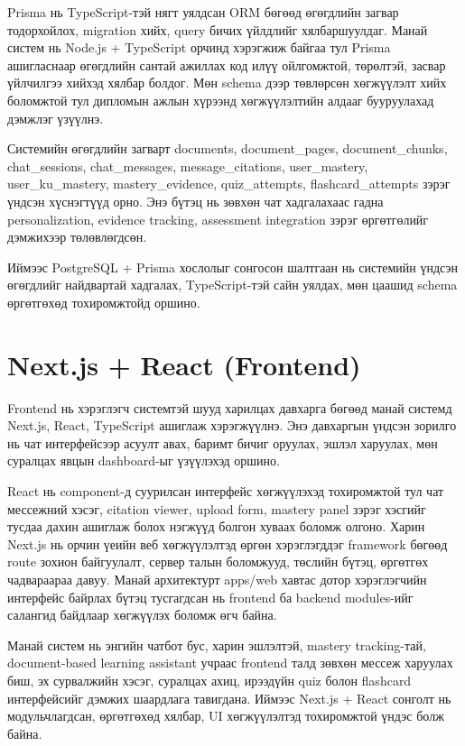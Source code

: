 \documentclass[12pt,A4]{report}
\newcommand{\eng}[1]{#1}
\begin{document}
\eng{Prisma} нь \eng{TypeScript}-тэй нягт уялдсан \eng{ORM} бөгөөд өгөгдлийн загвар тодорхойлох, migration хийх, query бичих үйлдлийг хялбаршуулдаг. Манай систем нь \eng{Node.js + TypeScript} орчинд хэрэгжиж байгаа тул \eng{Prisma} ашигласнаар өгөгдлийн сантай ажиллах код илүү ойлгомжтой, төрөлтэй, засвар үйлчилгээ хийхэд хялбар болдог. Мөн schema дээр төвлөрсөн хөгжүүлэлт хийх боломжтой тул дипломын ажлын хүрээнд хөгжүүлэлтийн алдааг бууруулахад дэмжлэг үзүүлнэ.

Системийн өгөгдлийн загварт \eng{documents}, \eng{document\_pages}, \eng{document\_chunks}, \eng{chat\_sessions}, \eng{chat\_messages}, \eng{message\_citations}, \eng{user\_mastery}, \eng{user\_ku\_mastery}, \eng{mastery\_evidence}, \eng{quiz\_attempts}, \eng{flashcard\_attempts} зэрэг үндсэн хүснэгтүүд орно. Энэ бүтэц нь зөвхөн чат хадгалахаас гадна personalization, evidence tracking, assessment integration зэрэг өргөтгөлийг дэмжихээр төлөвлөгдсөн.

Иймээс \eng{PostgreSQL + Prisma} хослолыг сонгосон шалтгаан нь системийн үндсэн өгөгдлийг найдвартай хадгалах, \eng{TypeScript}-тэй сайн уялдах, мөн цаашид schema өргөтгөхөд тохиромжтойд оршино.


\section{Next.js + React (Frontend)}

\eng{Frontend} нь хэрэглэгч системтэй шууд харилцах давхарга бөгөөд манай системд \eng{Next.js}, \eng{React}, \eng{TypeScript} ашиглаж хэрэгжүүлнэ. Энэ давхаргын үндсэн зорилго нь чат интерфейсээр асуулт авах, баримт бичиг оруулах, эшлэл харуулах, мөн суралцах явцын \eng{dashboard}-ыг үзүүлэхэд оршино.

\eng{React} нь \eng{component}-д суурилсан интерфейс хөгжүүлэхэд тохиромжтой тул чат мессежний хэсэг, citation viewer, upload form, mastery panel зэрэг хэсгийг тусдаа дахин ашиглаж болох нэгжүүд болгон хуваах боломж олгоно. Харин \eng{Next.js} нь орчин үеийн веб хөгжүүлэлтэд өргөн хэрэглэгддэг framework бөгөөд route зохион байгуулалт, сервер талын боломжууд, төслийн бүтэц, өргөтгөх чадвараараа давуу. Манай архитектурт \eng{apps/web} хавтас дотор хэрэглэгчийн интерфейс байрлах бүтэц тусгагдсан нь \eng{frontend} ба \eng{backend modules}-ийг салангид байдлаар хөгжүүлэх боломж өгч байна.

Манай систем нь энгийн чатбот бус, харин эшлэлтэй, mastery tracking-тай, document-based learning assistant учраас \eng{frontend} талд зөвхөн мессеж харуулах биш, эх сурвалжийн хэсэг, суралцах ахиц, ирээдүйн \eng{quiz} болон \eng{flashcard} интерфейсийг дэмжих шаардлага тавигдана. Иймээс \eng{Next.js + React} сонголт нь модульчлагдсан, өргөтгөхөд хялбар, UI хөгжүүлэлтэд тохиромжтой үндэс болж байна.
\end{document}
